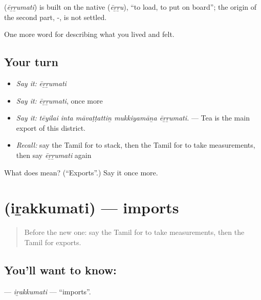 \begin{cousinweb}
\textbf{} (\emph{ēṟṟumati}) is built on the native  (\emph{ēṟṟu}), \textquotedblleft{}to load, to put on board\textquotedblright{}; the origin of the second part, -, is not settled.
\end{cousinweb}

\begin{grammarlens}[title={What you've built}]
One more word for describing what you lived and felt.
\end{grammarlens}

\subsection*{Your turn}
\begin{itemize}
\raggedright
  \item \emph{Say it:} \emph{ēṟṟumati}
  \item \emph{Say it:} \emph{ēṟṟumati}, once more
  \item \emph{Say it:} \emph{tēyilai inta māvaṭṭattiṉ mukkiyamāṉa ēṟṟumati.} — Tea is the main export of this district.
  \item \emph{Recall:} say the Tamil for to stack, then the Tamil for to take measurements, then say \emph{ēṟṟumati} again
\end{itemize}

\begin{tcolorbox}[breakable,colback=teal!4,colframe=teal!35!black,title={Before you move on}]
What does  mean? (\textquotedblleft{}Exports\textquotedblright{}.) Say it once more.
\end{tcolorbox}
\section[\texorpdfstring{\ta{இறக்குமதி} (iṟakkumati)}{இறக்குமதி (iṟakkumati)}]{ (iṟakkumati) — imports}

\label{lesson:TA-C511-irakkumati}



\begin{quote}
Before the new one: say the Tamil for to take measurements, then the Tamil for exports.
\end{quote}

\subsection*{You'll want to know: }
\textbf{} — \emph{iṟakkumati} — \textquotedblleft{}imports\textquotedblright{}.

